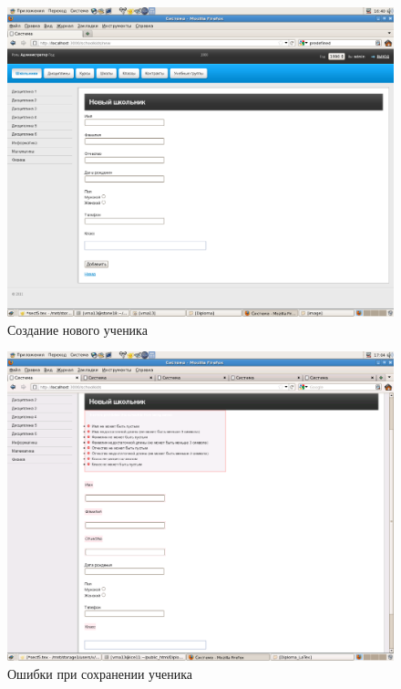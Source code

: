 \begin{figure}[ht]
\begin{center}
\includegraphics[scale=0.28]{image/schooler_new.png}
\caption{Создание нового ученика}
\end{center}
\end{figure}

\begin{figure}[ht]
\begin{center}
\includegraphics[scale=0.35]{image/schooler_error.png}
\caption{Ошибки при сохранении ученика}
\end{center}
\end{figure}
\endinput
